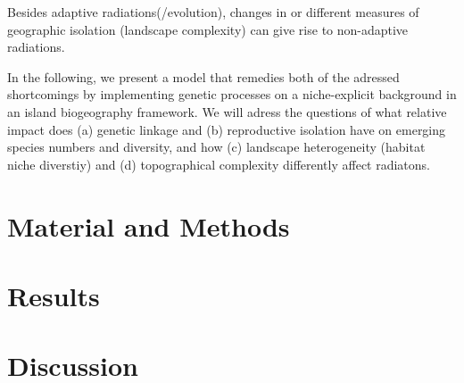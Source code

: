 \documentclass[a4paper]{scrartcl}
\begin{document}
Besides adaptive radiations(/evolution), changes in or different measures of geographic isolation (landscape complexity) can give rise to non-adaptive radiations.

In the following, we present a model that remedies both of the adressed shortcomings by implementing genetic processes on a niche-explicit background
in an island biogeography framework.
We will adress the questions of what relative impact does (a) genetic linkage and (b) reproductive isolation have on emerging species numbers and diversity,
and how (c) landscape heterogeneity (habitat niche diverstiy) and (d) topographical complexity differently affect radiatons.





\section{Material and Methods}

\section{Results}

\section{Discussion}


\printbibliography
\end{document}

